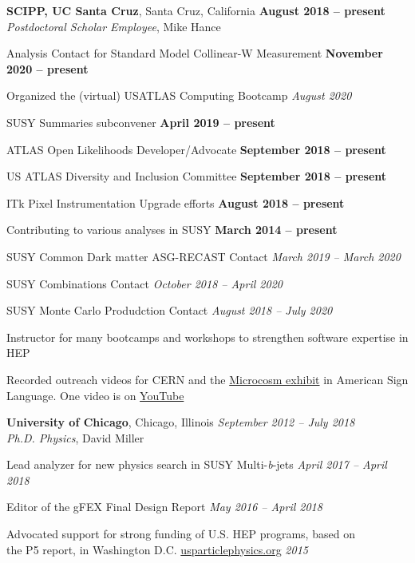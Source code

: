 \documentclass[margin,line]{resume}
\begin{document}
\begin{resume}
\textbf{SCIPP, UC Santa Cruz}, Santa Cruz, California \hfill \textbf{August 2018 -- present}\\
\textsl{Postdoctoral Scholar Employee}, Mike Hance
\begin{list2}
  \item Analysis Contact for Standard Model Collinear-W Measurement \hfill \textbf{November 2020 -- present}
  \item Organized the (virtual) USATLAS Computing Bootcamp \hfill \textsl{August 2020}
  \item SUSY Summaries subconvener \hfill \textbf{April 2019 -- present}
  \item ATLAS Open Likelihoods Developer/Advocate \hfill \textbf{September 2018 -- present}
  \item US ATLAS Diversity and Inclusion Committee \hfill \textbf{September 2018 -- present}
  \item ITk Pixel Instrumentation Upgrade efforts \hfill \textbf{August 2018 -- present}
  \item Contributing to various analyses in SUSY \hfill \textbf{March 2014 -- present}
  \item SUSY Common Dark matter ASG-RECAST Contact \hfill \textsl{March 2019 -- March 2020}
  \item SUSY Combinations Contact \hfill \textsl{October 2018 -- April 2020}
  \item SUSY Monte Carlo Produdction Contact \hfill \textsl{August 2018 -- July 2020}
  \item Instructor for many bootcamps and workshops to strengthen software expertise in HEP
  \item Recorded outreach videos for CERN and the \href{https://microcosm.web.cern.ch/en}{Microcosm exhibit} in American Sign Language. One video is on \href{https://www.youtube.com/watch?v=BaGjAruqFec}{YouTube}
\end{list2}
%
\textbf{University of Chicago}, Chicago, Illinois \hfill \textsl{September 2012 -- July 2018}\\
\textsl{Ph.D. Physics}, David Miller
\begin{list2}
  \item Lead analyzer for new physics search in SUSY Multi-\textsl{b}-jets \hfill \textsl{April 2017 -- April 2018}
  \item Editor of the gFEX Final Design Report \hfill \textsl{May 2016 -- April 2018}
  \item Advocated support for strong funding of U.S. HEP programs, based on\\ the P5 report, in Washington D.C. \href{https://www.usparticlephysics.org/strategy.html}{usparticlephysics.org} \hfill \textsl{2015}

\end{list2}
\end{resume}
\end{document}

